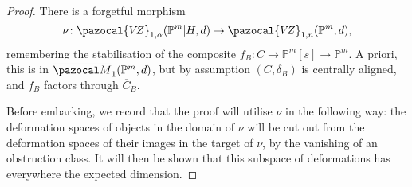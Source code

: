 \documentclass[11pt]{amsart}
\newcommand{\PP}{\mathbb P}
\newcommand{\VZ}{\pazocal{V\!Z}}
\renewcommand{\to}{\rightarrow}
\theoremstyle{definition}
\theoremstyle{definition}
\begin{document}
\begin{proof}
\begin{comment}
On restricting to the minimal genus one subcurve $D_F$, the line bundle $\mathcal O_{C}(-\alpha)$ is equivalent to the divisor $\sum a_i x_i$ where $x_i$ are the points connecting $D_F$ to the rest of the curve, and $a_i$ are the slopes of $\alpha$ along the edges corresponding to the $x_i$. Infinitesimally moving the point $x_i$ produces a nontrivial deformation of the line bundle $\mathcal O_{C}(-\alpha)$. The moduli space $\VZ_{1,n}(\mathbb P^m,d)$ is a logarithmically smooth fibration over the universal Picard stack over the stack of centrally aligned $n$-pointed genus one curves~\cite[Remark~4.5.3]{RSPW}. As a consequence, it is possible to find a logarithmic deformation of the map $(C,f_B)$ that induces the deformation of the line bundle that is given by infinitesimal motion. The obstruction group is $1$-dimensional, and we have produced a logarithmic deformation of the collapsed map that produces a nontrivial deformation of the line bundle $\mathcal O_{C}(-\alpha)$. Therefore, logarithmic deformations surject onto the obstruction space above. The absolute obstructions, which are the cokernel of this map therefore vanish, and the result follows.  
\end{comment}

There is a forgetful morphism
\[
\nu\colon \VZ_{1,\alpha}(\mathbb P^m|H,d)\to \VZ_{1,n}(\mathbb P^m,d),
\]
remembering the stabilisation of the composite $f_B\colon C\to\PP^m[s]\to\PP^m$. A priori, this is in $\overline{\pazocal M}_1(\PP^m,d)$, but by assumption $(C,\delta_B)$ is centrally aligned, and $f_B$ factors through $\overline C_B$. 

Before embarking, we record that the proof will utilise $\nu$ in the following way: the deformation spaces of objects in the domain of $\nu$ will be cut out from the deformation spaces of their images in the target of $\nu$, by the vanishing of an obstruction class. It will then be shown that this subspace of deformations has everywhere the expected dimension. 


\end{proof}
\end{document}
